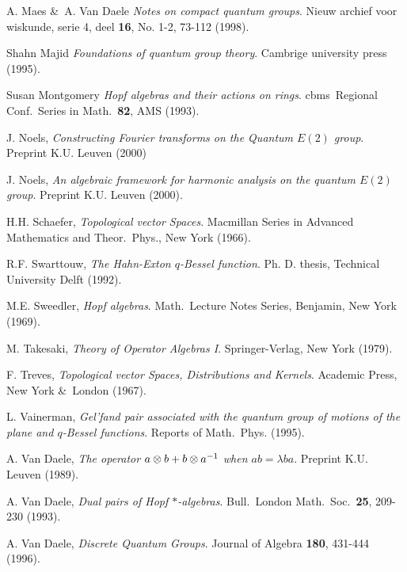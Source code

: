 \begin{thebibliography}{99}
 {\sc A. Maes \&\ A. Van Daele}
   {\em Notes on compact quantum groups}\@.
   Nieuw archief voor wiskunde, serie 4, deel {\bf 16}, No. 1-2, 73-112 (1998).

 {\sc Shahn Majid}
   {\em Foundations of quantum group theory}\@.
   Cambrige university press (1995).

 {\sc Susan Montgomery}
   {\em Hopf algebras and their actions on rings}\@.
   {\sc cbms}\ Regional Conf.\ Series in Math.\ {\bf 82}, AMS (1993).

 {\sc J. Noels},
   {\em Constructing Fourier transforms on the Quantum $E(2)$ group}\@.
   Preprint K.U. Leuven (2000)

 {\sc J. Noels},
   {\em An algebraic framework for harmonic analysis on the quantum $E(2)$ group}\@.
   Preprint K.U. Leuven (2000).

 {\sc H.H. Schaefer},
   {\em Topological vector Spaces}\@.
   Macmillan Series in Advanced Mathematics and Theor.\ Phys.,
   New York (1966).

 {\sc R.F. Swarttouw},
  {\em The Hahn-Exton $q$-Bessel function}\@.
   Ph. D. thesis, Technical University Delft (1992).

 {\sc M.E. Sweedler},
   {\em Hopf algebras}\@.
   Math.\ Lecture Notes Series, Benjamin, New York (1969).

 {\sc M. Takesaki},
   {\em Theory of Operator Algebras I}\@.
   Springer-Verlag, New York (1979).

 {\sc F. Treves},
   {\em Topological vector Spaces, Distributions and Kernels}\@.
   Academic Press, New York \&\ London (1967).

 {\sc L. Vainerman},
   {\em Gel'fand pair associated with the quantum group of motions of the plane and
        $q$-Bessel functions}\@. Reports of Math.\ Phys. (1995).

 {\sc A. Van Daele},
   {\em The operator $a \otimes b + b \otimes a^{-1}$ when $ab=\lambda ba$}\@.
   Preprint K.U. Leuven (1989).

 {\sc A. Van Daele},
   {\em Dual pairs of Hopf $*$-algebras}\@.
   Bull.\ London Math.\ Soc.\ {\bf 25}, 209-230 (1993).

 {\sc A. Van Daele},
   {\em Discrete Quantum Groups}\@.
   Journal of Algebra {\bf 180}, 431-444 (1996).


\end{thebibliography}

